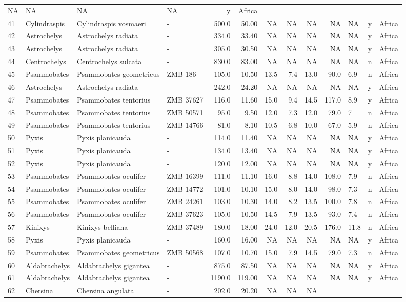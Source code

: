 \documentclass[]{article}
\begin{document}
\begin{longtable}[]{@{}llllrrrrrrlll@{}}
NA & NA & NA & NA & y & Africa\tabularnewline
41 & Cylindraspis & Cylindraspis vosmaeri & - & 500.0 & 50.00 & NA & NA
& NA & NA & NA & y & Africa\tabularnewline
42 & Astrochelys & Astrochelys radiata & - & 334.0 & 33.40 & NA & NA &
NA & NA & NA & y & Africa\tabularnewline
43 & Astrochelys & Astrochelys radiata & - & 305.0 & 30.50 & NA & NA &
NA & NA & NA & y & Africa\tabularnewline
44 & Centrochelys & Centrochelys sulcata & - & 830.0 & 83.00 & NA & NA &
NA & NA & NA & n & Africa\tabularnewline
45 & Psammobates & Psammobates geometricus & ZMB 186 & 105.0 & 10.50 &
13.5 & 7.4 & 13.0 & 90.0 & 6.9 & n & Africa\tabularnewline
46 & Astrochelys & Astrochelys radiata & - & 242.0 & 24.20 & NA & NA &
NA & NA & NA & y & Africa\tabularnewline
47 & Psammobates & Psammobates tentorius & ZMB 37627 & 116.0 & 11.60 &
15.0 & 9.4 & 14.5 & 117.0 & 8.9 & y & Africa\tabularnewline
48 & Psammobates & Psammobates tentorius & ZMB 50571 & 95.0 & 9.50 &
12.0 & 7.3 & 12.0 & 79.0 & 7 & n & Africa\tabularnewline
49 & Psammobates & Psammobates tentorius & ZMB 14766 & 81.0 & 8.10 &
10.5 & 6.8 & 10.0 & 67.0 & 5.9 & n & Africa\tabularnewline
50 & Pyxis & Pyxis planicauda & - & 114.0 & 11.40 & NA & NA & NA & NA &
NA & y & Africa\tabularnewline
51 & Pyxis & Pyxis planicauda & - & 134.0 & 13.40 & NA & NA & NA & NA &
NA & y & Africa\tabularnewline
52 & Pyxis & Pyxis planicauda & - & 120.0 & 12.00 & NA & NA & NA & NA &
NA & y & Africa\tabularnewline
53 & Psammobates & Psammobates oculifer & ZMB 16399 & 111.0 & 11.10 &
16.0 & 8.8 & 14.0 & 108.0 & 7.9 & n & Africa\tabularnewline
54 & Psammobates & Psammobates oculifer & ZMB 14772 & 101.0 & 10.10 &
15.0 & 8.0 & 14.0 & 98.0 & 7.3 & n & Africa\tabularnewline
55 & Psammobates & Psammobates oculifer & ZMB 24261 & 103.0 & 10.30 &
14.0 & 8.2 & 13.5 & 100.0 & 7.8 & n & Africa\tabularnewline
56 & Psammobates & Psammobates oculifer & ZMB 37623 & 105.0 & 10.50 &
14.5 & 7.9 & 13.5 & 93.0 & 7.4 & n & Africa\tabularnewline
57 & Kinixys & Kinixys belliana & ZMB 37489 & 180.0 & 18.00 & 24.0 &
12.0 & 20.5 & 176.0 & 11.8 & n & Africa\tabularnewline
58 & Pyxis & Pyxis planicauda & - & 160.0 & 16.00 & NA & NA & NA & NA &
NA & y & Africa\tabularnewline
59 & Psammobates & Psammobates geometricus & ZMB 50568 & 107.0 & 10.70 &
15.0 & 7.9 & 14.5 & 79.0 & 7.3 & n & Africa\tabularnewline
60 & Aldabrachelys & Aldabrachelys gigantea & - & 875.0 & 87.50 & NA &
NA & NA & NA & NA & y & Africa\tabularnewline
61 & Aldabrachelys & Aldabrachelys gigantea & - & 1190.0 & 119.00 & NA &
NA & NA & NA & NA & y & Africa\tabularnewline
62 & Chersina & Chersina angulata & - & 202.0 & 20.20 & NA & NA & NA &

\end{longtable}
\end{document}
